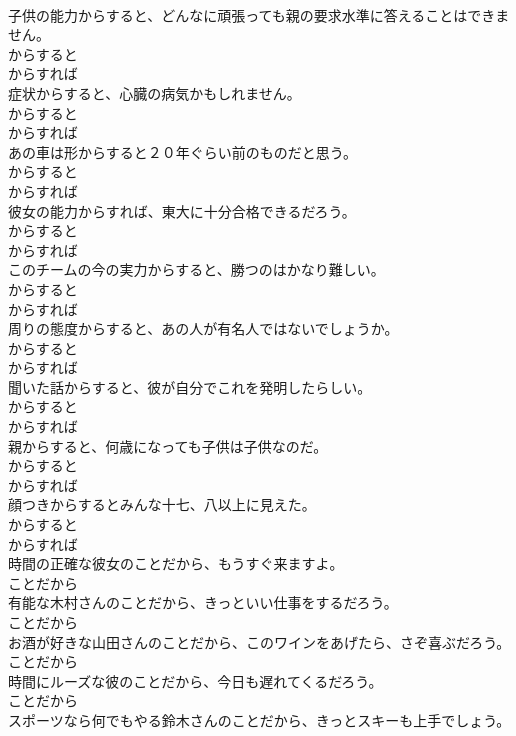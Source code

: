 \documentclass[8pt]{extreport}
\begin{document}
\begin{CJK}{UTF8}{min}
\\	子供の能力からすると、どんなに頑張っても親の要求水準に答えることはできません。	
\\	からすると 
\\	からすれば
\\	症状からすると、心臓の病気かもしれません。	
\\	からすると 
\\	からすれば
\\	あの車は形からすると２０年ぐらい前のものだと思う。	
\\	からすると 
\\	からすれば
\\	彼女の能力からすれば、東大に十分合格できるだろう。	
\\	からすると 
\\	からすれば
\\	このチームの今の実力からすると、勝つのはかなり難しい。	
\\	からすると 
\\	からすれば
\\	周りの態度からすると、あの人が有名人ではないでしょうか。	
\\	からすると 
\\	からすれば
\\	聞いた話からすると、彼が自分でこれを発明したらしい。	
\\	からすると 
\\	からすれば
\\	親からすると、何歳になっても子供は子供なのだ。	
\\	からすると 
\\	からすれば
\\	顔つきからするとみんな十七、八以上に見えた。	
\\	からすると 
\\	からすれば
\\	時間の正確な彼女のことだから、もうすぐ来ますよ。	
\\	ことだから
\\	有能な木村さんのことだから、きっといい仕事をするだろう。	
\\	ことだから
\\	お酒が好きな山田さんのことだから、このワインをあげたら、さぞ喜ぶだろう。	
\\	ことだから
\\	時間にルーズな彼のことだから、今日も遅れてくるだろう。	
\\	ことだから
\\	スポーツなら何でもやる鈴木さんのことだから、きっとスキーも上手でしょう。	

\end{CJK}
\end{document}
